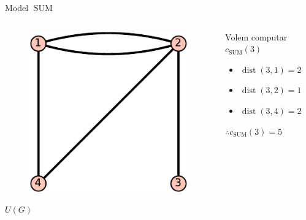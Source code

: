 \documentclass[aspectratio=169,handout]{beamer}
\DeclareMathOperator{\dist}{dist}
\DeclareMathOperator{\SUM}{SUM}
\begin{document}
\begin{frame}{Model $\SUM$}
    \begin{columns}
        \begin{column}{0.5\textwidth}
        \centering
        \begin{figure}
        \includegraphics[scale=0.75]{u-crop}
        \end{figure}
        \vspace{-1em}
        {\large $U(G)$}
        \end{column}
        
        \begin{column}{0.5\textwidth}
        Volem computar $c_{\SUM}(3)$
        
        \vspace{1em}

        \begin{itemize}
            \item[] $\dist(3,1) = 2$ 
            \item[] $\dist(3,2) = 1$
            \item[] $\dist(3,4) = 2$ 
        \end{itemize}
        
        \vspace{1em}
        
        $\therefore c_{\SUM}(3) = 5$
        \end{column}
    \end{columns}
\end{frame}
\end{document}
